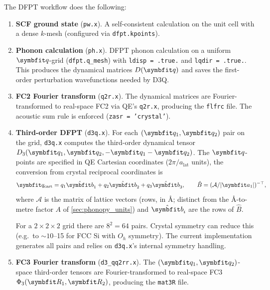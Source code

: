 The DFPT workflow does the following:
\begin{enumerate}
  \item \textbf{SCF ground state} (\texttt{pw.x}).
        A self-consistent calculation on the unit cell with a dense
        $k$-mesh (configured via \texttt{dfpt.kpoints}).

  \item \textbf{Phonon calculation} (\texttt{ph.x}).
        DFPT phonon calculation on a uniform $\vc{q}$-grid
        (\texttt{dfpt.q\_mesh}) with
        \texttt{ldisp\,=\,.true.} and \texttt{lqdir\,=\,.true.}.  This
        produces the dynamical matrices $D(\vc{q})$ and saves the
        first-order perturbation wavefunctions needed by D3Q.

  \item \textbf{FC2 Fourier transform} (\texttt{q2r.x}).
        The dynamical matrices are Fourier-transformed to real-space FC2
        via QE's \texttt{q2r.x}, producing the \texttt{flfrc} file.
        The acoustic sum rule is enforced
        (\texttt{zasr\,=\,'crystal'}).

  \item \textbf{Third-order DFPT} (\texttt{d3q.x}).
        For each $(\vc{q}_1,\vc{q}_2)$ pair on the grid, \texttt{d3q.x}
        computes the third-order dynamical tensor
        $D_3(\vc{q}_1,\vc{q}_2,-\vc{q}_1-\vc{q}_2)$.  The
        $\vc{q}$-points are specified in QE Cartesian coordinates
        ($2\pi/a_\text{lat}$ units), the conversion from crystal
        reciprocal coordinates is
        \begin{equation}\label{eq:q_conversion}
          \vc{q}_\text{cart}
          = q_1 \hat{\vc{b}}_1 + q_2 \hat{\vc{b}}_2 + q_3 \hat{\vc{b}}_3,
          \qquad
          \hat{B} = (\mathcal{A} / |\vc{a}_1|)^{-\top},
        \end{equation}
        where $\mathcal{A}$ is the matrix of lattice vectors (rows, in
        \AA; distinct from the \AA-to-metre factor $A$ of
        \cref{sec:phonopy_units}) and
        $\hat{\vc{b}}_i$ are the rows of $\hat{B}$.

        For a $2\times2\times2$ grid there are $8^2 = 64$ pairs.
        Crystal symmetry can reduce this (e.g.\ to ${\sim}10$--15 for
        FCC Si with $O_h$ symmetry). The current implementation
        generates all pairs and relies on \texttt{d3q.x}'s internal
        symmetry handling.

  \item \textbf{FC3 Fourier transform} (\texttt{d3\_qq2rr.x}).
        The $(\vc{q}_1,\vc{q}_2)$-space third-order tensors are
        Fourier-transformed to real-space FC3
        $\Phi_3(\vc{R}_1,\vc{R}_2)$, producing the \texttt{mat3R} file.


\end{enumerate}
